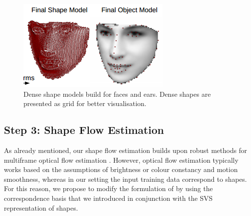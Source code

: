\begin{figure}[b!]
    \centering
    \includegraphics[width=0.9\columnwidth]{resources/models}
    \caption{Dense shape models build for faces and ears. Dense shapes are presented as grid for better visualisation.}
    \label{fig:dense_models}
\end{figure}




\vspace{0.3cm}
{\label{sec:step3}\subsection*{Step 3: Shape Flow Estimation}}



As already mentioned, our shape flow estimation builds upon robust methods for multiframe optical flow estimation \cite{Garg:2013hu}. However, optical flow estimation typically works based on the assumptions of brightness or colour constancy and motion smoothness, whereas in our setting the input training data correspond to shapes. For this reason, we propose to modify the formulation of \cite{Garg:2013hu} by using the correspondence basis that we introduced in conjunction with the SVS representation of shapes.


